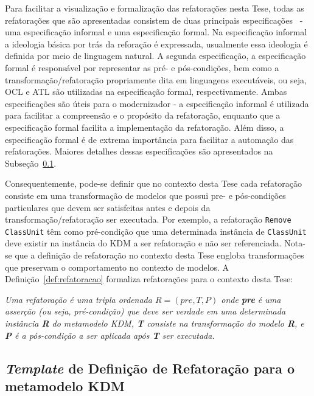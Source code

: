 Para facilitar a visualização e formalização das refatorações nesta Tese, todas as refatorações que são apresentadas consistem de duas principais especificações~\cite{staron2004implementing} - uma especificação informal e uma especificação formal. Na especificação informal a ideologia básica por trás da reforação é expressada, usualmente essa ideologia é definida por meio de linguagem natural. A segunda especificação, a especificação formal é responsável por representar as pré- e pós-condições, bem como a transformação/refatoração propriamente dita em linguagens executáveis, ou seja, OCL e ATL são utilizadas na especificação formal, respectivamente. Ambas especificações são úteis para o modernizador - a especificação informal é utilizada para facilitar a compreensão e o propósito da refatoração, enquanto que a especificação formal facilita a implementação da refatoração. Além disso, a especificação formal é de extrema importância para facilitar a automação das refatorações. Maiores detalhes dessas especificações são apresentados na Subseção~\ref{sec:template_refatoracao}.

Consequentemente, pode-se definir que no contexto desta Tese cada refatoração consiste em uma transformação de modelos que possui pre- e pós-condições particulares que devem ser satisfeitas antes e depois da transformação/refatoração ser executada. Por exemplo, a refatoração \texttt{Remove ClassUnit} têm como pré-condição que uma determinada instância de \texttt{ClassUnit} deve existir na instância do KDM a ser refatoração e não ser referenciada. Nota-se que a definição de refatoração no contexto desta Tese engloba transformações que preservam o comportamento no contexto de modelos. A Definição~\ref{def:refatoracao} formaliza refatorações para o contexto desta Tese:


\begin{definicao}\label{def:refatoracao}
    \textit{Uma refatoração é uma tripla ordenada $R = (pre, T, P)$ onde \textbf{pre} é uma asserção (ou seja, pré-condição) que deve ser verdade em uma determinada instância \textbf{R} do metamodelo KDM, \textbf{T} consiste na transformação do modelo \textbf{R}, e \textbf{P} é a pós-condição a ser aplicada após \textbf{T} ser executada.}
\end{definicao}


\subsection{\textit{Template} de Definição de Refatoração para o metamodelo KDM}\label{sec:template_refatoracao}

